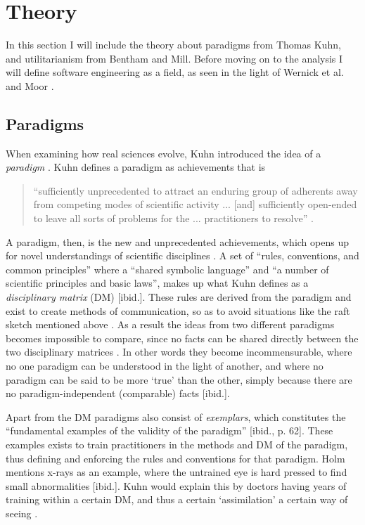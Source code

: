 \documentclass{article}
\begin{document}
\section{Theory}
In this section I will include the theory about paradigms from Thomas Kuhn, and utilitarianism from Bentham and Mill. Before moving on to the analysis I will define software engineering as a field, as seen in the light of Wernick et al. and Moor \citep{Wernick:2004, Moor:1985}.

\subsection{Paradigms} \label{Theory:Paradigms}
When examining how real sciences evolve, Kuhn introduced the idea of a \textit{paradigm} \citep[p. 59]{Holm:2014}. Kuhn defines a paradigm as achievements that is
\begin{quote}
``sufficiently unprecedented to attract an enduring group of adherents away from competing modes of scientific activity ... [and] sufficiently open-ended to leave all sorts of problems for the ... practitioners to resolve'' \citep[p. 10-11]{Kuhn:2012}.
\end{quote}
A paradigm, then, is the new and unprecedented achievements, which opens up for novel understandings of scientific disciplines \citep[p. 61]{Holm:2014}. A set of ``rules, conventions, and common principles'' where a ``shared symbolic language'' and ``a number of scientific principles and basic laws'', makes up what Kuhn defines as a \textit{disciplinary matrix} (DM) [ibid.]. These rules are derived from the paradigm and exist to create methods of communication, so as to avoid situations like the raft sketch mentioned above \citep[p. 181]{Kuhn:2012}. As a result the ideas from two different paradigms becomes impossible to compare, since no facts can be shared directly between the two disciplinary matrices \citep[p. 66]{Holm:2014}. In other words they become incommensurable, where no one paradigm can be understood in the light of another, and where no paradigm can be said to be more `true' than the other, simply because there are no paradigm-independent (comparable) facts [ibid.].

Apart from the DM paradigms also consist of \textit{exemplars}, which constitutes the ``fundamental examples of the validity of the paradigm'' [ibid., p. 62]. These examples exists to train practitioners in the methods and DM of the paradigm, thus defining and enforcing the rules and conventions for that paradigm. Holm mentions x-rays as an example, where the untrained eye is hard pressed to find small abnormalities [ibid.]. Kuhn would explain this by doctors having years of training within a certain DM, and thus a certain `assimilation' a certain way of seeing \citep[p. 189]{Kuhn:2012}.
\end{document}
